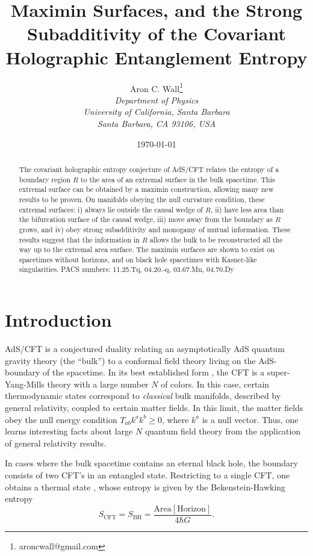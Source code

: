 \documentclass{article}
\author{Aron C. Wall\footnote{aroncwall@gmail.com}
\\ \textit{Department of Physics} \\ \textit{University of California, Santa Barbara}
\\ \textit{Santa Barbara, CA 93106, USA} }
\title{Maximin Surfaces, and the Strong Subadditivity of the Covariant Holographic Entanglement Entropy}
\date{\today}
\begin{document}
\maketitle

\begin{abstract}
The covariant holographic entropy conjecture of AdS/CFT relates the entropy of a boundary region $R$ to the area of an extremal surface in the bulk spacetime.  This extremal surface can be obtained by a maximin construction, allowing many new results to be proven.  On manifolds obeying the null curvature condition, these extremal surfaces: i) always lie outside the causal wedge of $R$, ii) have less area than the bifurcation surface of the causal wedge, iii) move away from the boundary as $R$ grows, and iv) obey strong subadditivity and monogamy of mutual information.  These results suggest that the information in $R$ allows the bulk to be reconstructed all the way up to the extremal area surface.  The maximin surfaces are shown to exist on spacetimes without horizons, and on black hole spacetimes with Kasner-like singularities.
\newline\newline
PACS numbers: 11.25.Tq, 04.20.-q, 03.67.Mn, 04.70.Dy
\end{abstract}

\vspace{-.5cm}

\tableofcontents

\section{Introduction}\label{intro}

AdS/CFT is a conjectured duality relating an asymptotically AdS quantum gravity theory (the ``bulk'') to a conformal field theory living on the AdS-boundary of the spacetime.  In its best established form \cite{AdSCFT}, the CFT is a super-Yang-Mills theory with a large number $N$ of colors.  In this case, certain thermodynamic states correspond to \emph{classical} bulk manifolds, described by general relativity, coupled to certain matter fields.  In this limit, the matter fields obey the null energy condition $T_{ab} k^a k^b \ge 0$, where $k^a$ is a null vector.  Thus, one learns interesting facts about large $N$ quantum field theory from the application of general relativity results.

In cases where the bulk spacetime contains an eternal black hole, the boundary consists of two CFT's in an entangled state.  Restricting to a single CFT, one obtains a thermal state \cite{maldacena01}, whose entropy is given by the Bekenstein-Hawking entropy
\begin{equation}\label{BH}
S_\mathrm{CFT} = S_\mathrm{BH} = \frac{ \mathrm{Area} [ \mathrm{Horizon} ] }{4\hbar G}.
\end{equation}
\end{document}

